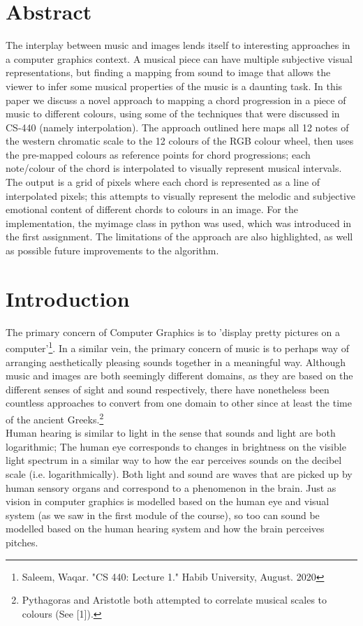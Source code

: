 \documentclass{article}
\begin{document}
\tableofcontents
\newpage
\section{Abstract}

The interplay between music and images lends itself to interesting approaches in a computer graphics context. A musical piece can have multiple subjective visual representations, but finding a mapping from sound to image that allows the viewer to infer some musical properties of the music is a daunting task. In this paper we discuss a novel approach to mapping a chord progression in a piece of music to different colours, using some of the techniques that were discussed in CS-440 (namely interpolation). The approach outlined here maps all 12 notes of the western chromatic scale to the 12 colours of the RGB colour wheel, then uses the pre-mapped colours as reference points for chord progressions; each note/colour of the chord is interpolated to visually represent musical intervals. The output is a grid of pixels where each chord is represented as a line of interpolated pixels; this attempts to visually represent the melodic and subjective emotional content of different chords to colours in an image. For the implementation, the myimage class in python was used, which was introduced in the first assignment. The limitations of the approach are also highlighted, as well as possible future improvements to the algorithm.

\section{Introduction}

The primary concern of Computer Graphics is to 'display pretty pictures on a computer'\footnote{Saleem, Waqar. "CS 440: Lecture 1." Habib University, August. 2020}. In a similar vein, the primary concern of music is to perhaps way of arranging aesthetically pleasing sounds together in a meaningful way. Although music and images are both seemingly different domains, as they are based on the different senses of sight and sound respectively, there have nonetheless been countless approaches to convert from one domain to other since at least the time of the ancient Greeks.\footnote{Pythagoras and Aristotle both attempted to correlate musical scales to colours (See [1]).}\\

Human hearing is similar to light in the sense that sounds and light are both logarithmic; The human eye corresponds to changes in brightness on the visible light spectrum in a similar way to how the ear perceives sounds on the decibel scale (i.e. logarithmically). Both light and sound are waves that are picked up by human sensory organs and correspond to a phenomenon in the brain. Just as vision in computer graphics is modelled based on the human eye and visual system (as we saw in the first module of the course), so too can sound be modelled based on the human hearing system and how the brain perceives pitches.\\
\end{document}
